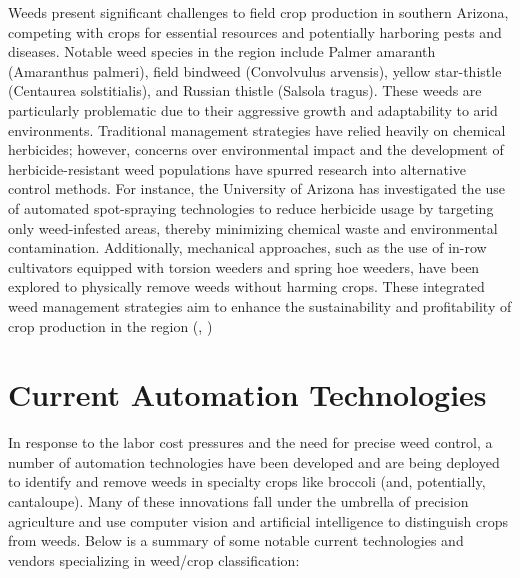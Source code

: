 \documentclass[letterpaper]{report}
\begin{document}
Weeds present significant challenges to field crop production in southern Arizona, competing with crops for essential resources and potentially harboring pests and diseases. Notable weed species in the region include Palmer amaranth (Amaranthus palmeri), field bindweed (Convolvulus arvensis), yellow star-thistle (Centaurea solstitialis), and Russian thistle (Salsola tragus). These weeds are particularly problematic due to their aggressive growth and adaptability to arid environments. Traditional management strategies have relied heavily on chemical herbicides; however, concerns over environmental impact and the development of herbicide-resistant weed populations have spurred research into alternative control methods. For instance, the University of Arizona has investigated the use of automated spot-spraying technologies to reduce herbicide usage by targeting only weed-infested areas, thereby minimizing chemical waste and environmental contamination. Additionally, mechanical approaches, such as the use of in-row cultivators equipped with torsion weeders and spring hoe weeders, have been explored to physically remove weeds without harming crops. These integrated weed management strategies aim to enhance the sustainability and profitability of crop production in the region (\cite{Sturla2022-ug}, \cite{University-or-Arizona-CALESUnknown-qj}) 

\section{Current Automation Technologies}

In response to the labor cost pressures and the need for precise weed control, a number of automation technologies have been developed and are being deployed to identify and remove weeds in specialty crops like broccoli (and, potentially, cantaloupe). Many of these innovations fall under the umbrella of precision agriculture and use computer vision and artificial intelligence to distinguish crops from weeds. Below is a summary of some notable current technologies and vendors specializing in weed/crop classification:
\end{document}
